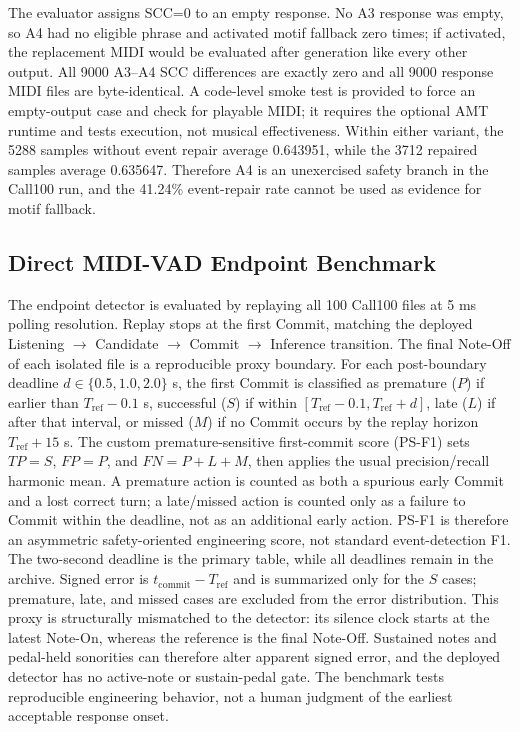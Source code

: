 \documentclass[11pt,a4paper]{article}
\begin{document}
The evaluator assigns SCC=0 to an empty response. No A3 response was empty, so A4 had no eligible phrase and activated motif fallback zero times; if activated, the replacement MIDI would be evaluated after generation like every other output. All 9000 A3--A4 SCC differences are exactly zero and all 9000 response MIDI files are byte-identical. A code-level smoke test is provided to force an empty-output case and check for playable MIDI; it requires the optional AMT runtime and tests execution, not musical effectiveness. Within either variant, the 5288 samples without event repair average 0.643951, while the 3712 repaired samples average 0.635647. Therefore A4 is an unexercised safety branch in the Call100 run, and the 41.24\% event-repair rate cannot be used as evidence for motif fallback.

\subsection{Direct MIDI-VAD Endpoint Benchmark}
\label{subsec:endpoint-benchmark}

The endpoint detector is evaluated by replaying all 100 Call100 files at 5 ms polling resolution. Replay stops at the first Commit, matching the deployed Listening $\rightarrow$ Candidate $\rightarrow$ Commit $\rightarrow$ Inference transition. The final Note-Off of each isolated file is a reproducible proxy boundary. For each post-boundary deadline $d\in\{0.5,1.0,2.0\}$ s, the first Commit is classified as premature ($P$) if earlier than $T_{\mathrm{ref}}-0.1$ s, successful ($S$) if within $[T_{\mathrm{ref}}-0.1,T_{\mathrm{ref}}+d]$, late ($L$) if after that interval, or missed ($M$) if no Commit occurs by the replay horizon $T_{\mathrm{ref}}+15$ s. The custom premature-sensitive first-commit score (PS-F1) sets $TP=S$, $FP=P$, and $FN=P+L+M$, then applies the usual precision/recall harmonic mean. A premature action is counted as both a spurious early Commit and a lost correct turn; a late/missed action is counted only as a failure to Commit within the deadline, not as an additional early action. PS-F1 is therefore an asymmetric safety-oriented engineering score, not standard event-detection F1. The two-second deadline is the primary table, while all deadlines remain in the archive. Signed error is $t_{\mathrm{commit}}-T_{\mathrm{ref}}$ and is summarized only for the $S$ cases; premature, late, and missed cases are excluded from the error distribution. This proxy is structurally mismatched to the detector: its silence clock starts at the latest Note-On, whereas the reference is the final Note-Off. Sustained notes and pedal-held sonorities can therefore alter apparent signed error, and the deployed detector has no active-note or sustain-pedal gate. The benchmark tests reproducible engineering behavior, not a human judgment of the earliest acceptable response onset.
\end{document}
